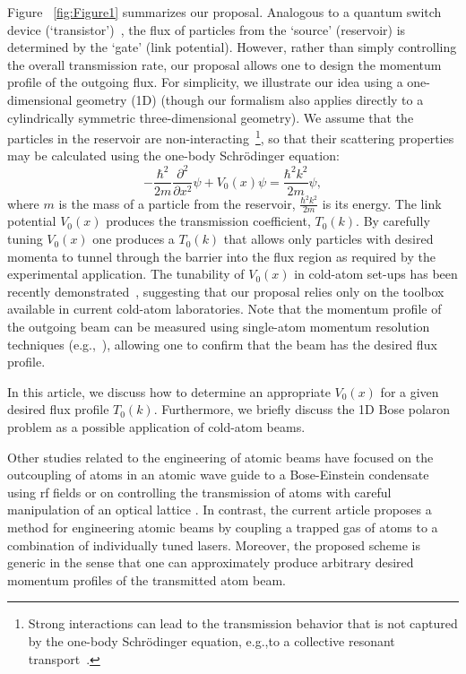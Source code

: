 \documentclass[reprint, twocolumn,amsmath,amssymb,showpacs,pra,superscriptaddress,aps]{revtex4-1}
\begin{document}
Figure ~\ref{fig:Figure1} summarizes our proposal. Analogous to a quantum switch device (`transistor')~\cite{zoller2004, marchukov2016,thuberg2017}, the flux of particles from the `source' (reservoir) is determined by the `gate' (link potential). However, rather than simply controlling the overall transmission rate, our proposal allows one to design the momentum profile of the outgoing flux.
 For simplicity, we illustrate our idea using a one-dimensional geometry (1D) (though our formalism also applies directly to a cylindrically symmetric three-dimensional geometry). We assume that the particles in the reservoir are non-interacting~\footnote{Strong interactions can lead to the transmission behavior that is not captured by the one-body Schr{\"o}dinger equation, e.g.,to a collective resonant transport~\cite{Schlagheck2005}.}, so that their scattering properties may be calculated using the one-body Schr{\"o}dinger equation:
\begin{equation}
-\frac{\hbar^2}{2m}\frac{\partial^2}{\partial x^2}\psi+V_0(x)\psi=\frac{\hbar^2k^2}{2m}\psi,
\label{eq:schr}
\end{equation}
where $m$ is the mass of a particle from the reservoir, $\frac{\hbar^2k^2}{2m}$ is its energy. The link potential $V_0(x)$ produces the transmission coefficient, $T_0(k)$. By carefully tuning $V_0(x)$ one produces a $T_0(k)$ that allows only particles with desired momenta to tunnel through the barrier into the flux region as required by the experimental application. The tunability of $V_0(x)$ in cold-atom set-ups has been recently demonstrated~\cite{esslinger2015,esslinger2018,esslinger2019}, 
suggesting that our proposal relies only on the toolbox available in current cold-atom laboratories.
Note that the momentum profile of the outgoing beam can be measured using single-atom momentum resolution techniques (e.g.,~\cite{jochim2018}), allowing one to confirm that the beam has the desired flux profile.

In this article, we discuss how to determine an appropriate $V_0(x)$ for a given desired flux profile $T_0(k)$. Furthermore, we briefly discuss the 1D Bose polaron problem as a possible application of cold-atom beams. 

Other studies related to the engineering of atomic beams have focused on the  outcoupling of atoms in an atomic wave guide to a Bose-Einstein condensate using rf fields \cite{PhysRevLett.97.200402, PhysRevA.80.041605, buning2010slow} or on controlling the transmission of atoms with careful manipulation of an optical lattice \cite{PhysRevLett.84.399, PhysRevLett.107.230401, PhysRevA.92.033614}. In contrast, the current article proposes a method for engineering atomic beams by coupling a trapped gas of atoms to a combination of individually tuned lasers. Moreover, the proposed scheme is generic in the sense that one can approximately produce arbitrary desired momentum profiles of the transmitted atom beam.
\end{document}
